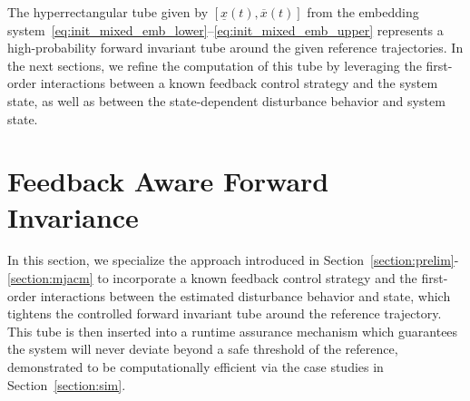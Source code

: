 \documentclass{IEEEojcsys}
\newcommand{\ul}{\underline}
\newcommand{\ol}{\overline}
\begin{document}
The hyperrectangular tube given by $[\ul{x}(t), \ol{x}(t)]$ from the embedding system~\eqref{eq:init_mixed_emb_lower}--\eqref{eq:init_mixed_emb_upper} represents a high-probability forward invariant tube around the given reference trajectories. In the next sections, we refine the computation of this tube by leveraging the first-order interactions between a known feedback control strategy and the system state, as well as between the state-dependent disturbance behavior and system state.


\section{Feedback Aware Forward Invariance}
\label{section:finv}

In this section, 
we specialize the approach introduced in Section~\ref{section:prelim}-\ref{section:mjacm} to incorporate a known feedback control strategy and the first-order interactions between the estimated disturbance behavior and state, which tightens the controlled forward invariant tube around the reference trajectory.
This tube is then inserted into a runtime assurance mechanism which guarantees the system will never deviate beyond a safe threshold of the reference, demonstrated to be computationally efficient via the case studies in Section~\ref{section:sim}.
\end{document}
